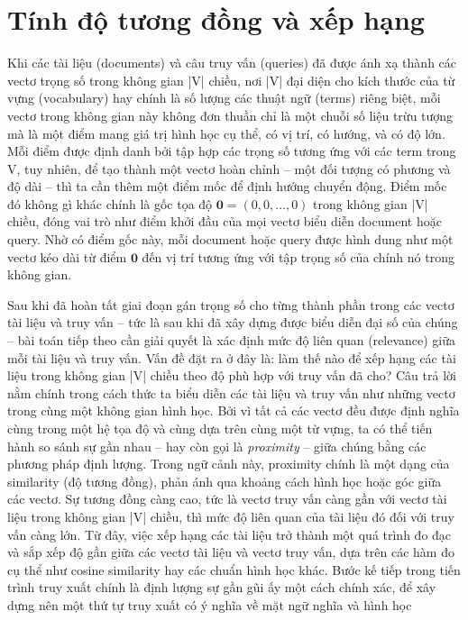 \section{Tính độ tương đồng và xếp hạng}
Khi các tài liệu (documents) và câu truy vấn (queries) đã được ánh xạ thành các vectơ trọng số trong không gian |V| chiều, nơi |V| đại diện cho kích thước của từ vựng (vocabulary) hay chính là số lượng các thuật ngữ (terms) riêng biệt, mỗi vectơ trong không gian này không đơn thuần chỉ là một chuỗi số liệu trừu tượng mà là một điểm mang giá trị hình học cụ thể, có vị trí, có hướng, và có độ lớn. Mỗi điểm được định danh bởi tập hợp các trọng số tương ứng với các term trong V, tuy nhiên, để tạo thành một vectơ hoàn chỉnh -- một đối tượng có phương và độ dài -- thì ta cần thêm một điểm mốc để định hướng chuyển động. Điểm mốc đó không gì khác chính là gốc tọa độ \(\mathbf{0} = (0, 0, \dots, 0)\) trong không gian |V| chiều, đóng vai trò như điểm khởi đầu của mọi vectơ biểu diễn document hoặc query. Nhờ có điểm gốc này, mỗi document hoặc query được hình dung như một vectơ kéo dài từ điểm \(\mathbf{0}\) đến vị trí tương ứng với tập trọng số của chính nó trong không gian.

Sau khi đã hoàn tất giai đoạn gán trọng số cho từng thành phần trong các vectơ tài liệu và truy vấn -- tức là sau khi đã xây dựng được biểu diễn đại số của chúng -- bài toán tiếp theo cần giải quyết là xác định mức độ liên quan (relevance) giữa mỗi tài liệu và truy vấn. Vấn đề đặt ra ở đây là: làm thế nào để xếp hạng các tài liệu trong không gian |V| chiều theo độ phù hợp với truy vấn đã cho? Câu trả lời nằm chính trong cách thức ta biểu diễn các tài liệu và truy vấn như những vectơ trong cùng một không gian hình học. Bởi vì tất cả các vectơ đều được định nghĩa cùng trong một hệ tọa độ và cùng dựa trên cùng một từ vựng, ta có thể tiến hành so sánh sự gần nhau -- hay còn gọi là \textit{proximity} -- giữa chúng bằng các phương pháp định lượng. Trong ngữ cảnh này, proximity chính là một dạng của similarity (độ tương đồng), phản ánh qua khoảng cách hình học hoặc góc giữa các vectơ. Sự tương đồng càng cao, tức là vectơ truy vấn càng gần với vectơ tài liệu trong không gian |V| chiều, thì mức độ liên quan của tài liệu đó đối với truy vấn càng lớn. Từ đây, việc xếp hạng các tài liệu trở thành một quá trình đo đạc và sắp xếp độ gần giữa các vectơ tài liệu và vectơ truy vấn, dựa trên các hàm đo cụ thể như cosine similarity hay các chuẩn hình học khác. Bước kế tiếp trong tiến trình truy xuất chính là định lượng sự gần gũi ấy một cách chính xác, để xây dựng nên một thứ tự truy xuất có ý nghĩa về mặt ngữ nghĩa và hình học

